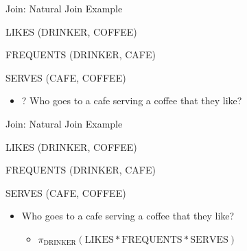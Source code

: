 \documentclass[aspectratio=169]{beamer}
\newenvironment{noindentitemize}
{ \begin{itemize}
 \setlength{\itemsep}{1.5ex}
  \setlength{\parsep}{0pt}   
  \setlength{\parskip}{0pt}
 \addtolength{\leftskip}{-2em}
 }
{ \end{itemize} }
\newenvironment{noindentitemize2}
{ \begin{itemize}
  \setlength{\itemsep}{0ex}
  \setlength{\parskip}{0pt}
  \setlength{\parsep}{0pt}   
  \addtolength{\leftskip}{-2em}  }
{ \end{itemize} }
\newcommand{\STUDENT}{\textrm{STUDENT}}
\newcommand{\ENROLL}{\textrm{ENROLL}}
\newcommand{\COURSE}{\textrm{COURSE}}
\newcommand{\LIKES}{\textrm{LIKES}}
\newcommand{\FREQUENTS}{\textrm{FREQUENTS}}
\newcommand{\SERVES}{\textrm{SERVES}}
\newcommand{\DRINKER}{\textrm{DRINKER}}
\begin{document}

\begin{frame}{Join: Natural Join Example}

LIKES (DRINKER, COFFEE)

FREQUENTS (DRINKER, CAFE)

SERVES (CAFE, COFFEE)

\begin{noindentitemize}
\item[?] Who goes to a cafe serving a coffee that they like?
\end{noindentitemize}

\end{frame}


\begin{frame}{Join: Natural Join Example}

LIKES (DRINKER, COFFEE)

FREQUENTS (DRINKER, CAFE)

SERVES (CAFE, COFFEE)

\begin{noindentitemize}
\item Who goes to a cafe serving a coffee that they like?
	\begin{noindentitemize2}
	\item $\pi_{\DRINKER} (\LIKES * \FREQUENTS * \SERVES)$
	\end{noindentitemize2}
\end{noindentitemize}

\end{frame}
%
%
%
%
%
%
%
%
%
%
%
%
%
%
%
\end{document}
